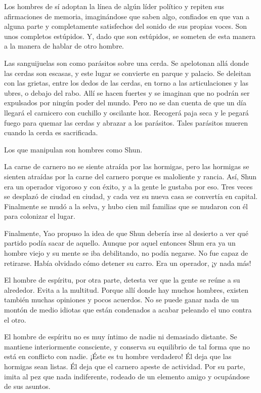 \documentclass[hidelinks]{memoir}
\begin{document}
	Los hombres de sí adoptan la línea de algún líder político y repiten sus
	afirmaciones de memoria, imaginándose que saben algo, confiados en que
	van a alguna parte y completamente satisfechos del sonido de sus propias
	voces. Son unos completos estúpidos. Y, dado que son estúpidos, se
	someten de esta manera a la manera de hablar de otro hombre.
	
	Las sanguijuelas son como parásitos sobre una cerda. Se apelotonan allá
	donde las cerdas son escasas, y este lugar se convierte en parque y
	palacio. Se deleitan con las grietas, entre los dedos de las cerdas, en
	torno a las articulaciones y las ubres, o debajo del rabo. Allí se hacen
	fuertes y se imaginan que no podrán ser expulsados por ningún poder del
	mundo. Pero no se dan cuenta de que un día llegará el carnicero con
	cuchillo y oscilante hoz. Recogerá paja seca y le pegará fuego para
	quemar las cerdas y abrazar a los parásitos. Tales parásitos mueren
	cuando la cerda es sacrificada.
	
	Los que manipulan son hombres como Shun.
	
	La carne de carnero no se siente atraída por las hormigas, pero las
	hormigas se sienten atraídas por la carne del carnero porque es
	maloliente y rancia. Así, Shun era un operador vigoroso y con éxito, y a
	la gente le gustaba por eso. Tres veces se desplazó de ciudad en ciudad,
	y cada vez su nueva casa se convertía en capital. Finalmente se mudó a
	la selva, y hubo cien mil familias que se mudaron con él para colonizar
	el lugar.
	
	Finalmente, Yao propuso la idea de que Shun debería irse al desierto a
	ver qué partido podía sacar de aquello. Aunque por aquel entonces Shun
	era ya un hombre viejo y su mente se iba debilitando, no podía negarse.
	No fue capaz de retirarse. Había olvidado cómo detener su carro. Era un
	operador, ¡y nada más!
	
	El hombre de espíritu, por otra parte, detesta ver que la gente se reúne
	a su alrededor. Evita a la multitud. Porque allí donde hay muchos
	hombres, existen también muchas opiniones y pocos acuerdos. No se puede
	ganar nada de un montón de medio idiotas que están condenados a acabar
	peleando el uno contra el otro.
	
	El hombre de espíritu no es muy íntimo de nadie ni demasiado distante.
	Se mantiene interiormente consciente, y conserva su equilibrio de tal
	forma que no está en conflicto con nadie. ¡Éste es tu hombre verdadero!
	Él deja que las hormigas sean listas. Él deja que el carnero apeste de
	actividad. Por su parte, imita al pez que nada indiferente, rodeado de
	un elemento amigo y ocupándose de sus asuntos.
	
\end{document}
